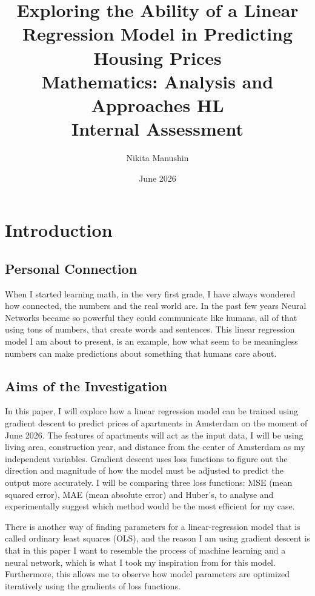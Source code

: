 \documentclass{article}
\title{
    Exploring the Ability of a Linear Regression Model in Predicting Housing Prices\\[0.7em]
    \large Mathematics: Analysis and Approaches HL \\
    Internal Assessment
}
\author{Nikita Manushin}
\date{June 2026}
\begin{document}
\maketitle


\section{Introduction}

\subsection{Personal Connection}

When I started learning math, in the very first grade, I have always wondered how connected,
the numbers and the real world are. In the past few years Neural Networks became so powerful
they could communicate like humans, all of that using tons of numbers, that create words
and sentences. This linear regression model I am about to present, is an example, how what
seem to be meaningless numbers can make predictions about something that humans care about.

\subsection{Aims of the Investigation}

In this paper, I will explore how a linear regression model can be trained using gradient descent
to predict prices of apartments in Amsterdam on the moment of June 2026. The features of
apartments will act as the input data, I will be using living area, construction year, and
distance from the center of Amsterdam as my independent variables. Gradient descent uses
loss functions to figure out the direction and magnitude of how the model must be adjusted
to predict the output more accurately. I will be comparing three loss functions: MSE (mean
squared error), MAE (mean absolute error) and Huber's, to analyse and experimentally suggest
which method would be the most efficient for my case.

There is another way of finding parameters for a linear-regression model that is called
ordinary least squares (OLS), and the reason I am using gradient descent is that in this
paper I want to resemble the process of machine learning and a neural network, which is
what I took my inspiration from for this model. Furthermore, this allows me to observe
how model parameters are optimized iteratively using the gradients of loss functions.
\end{document}
